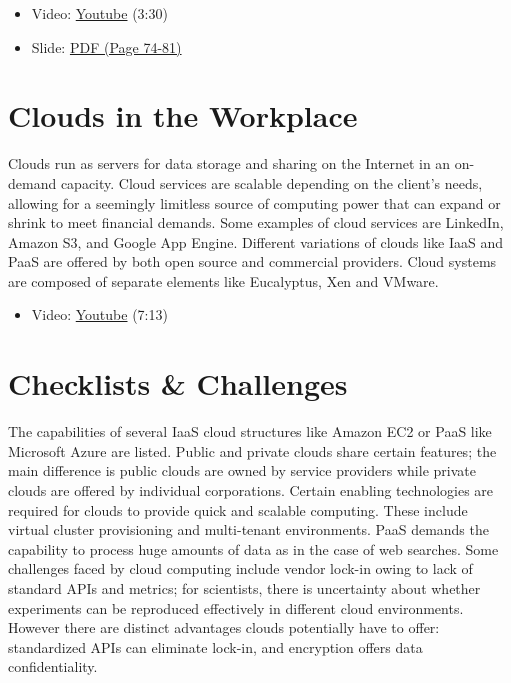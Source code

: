 \begin{itemize}

\item
  Video: \href{https://www.youtube.com/watch?v=mvXBRvTwAVg}{Youtube}
  (3:30)
\item
  Slide:
  \href{https://drive.google.com/open?id=0B88HKpainTSfQU1uQmxZWHdWQ1k}{PDF
  (Page 74-81)}
\end{itemize}

\section{Clouds in the Workplace}\label{clouds-in-the-workplace}

Clouds run as servers for data storage and sharing on the Internet in an
on-demand capacity. Cloud services are scalable depending on the
client's needs, allowing for a seemingly limitless source of computing
power that can expand or shrink to meet financial demands. Some examples
of cloud services are LinkedIn, Amazon S3, and Google App Engine.
Different variations of clouds like IaaS and PaaS are offered by both
open source and commercial providers. Cloud systems are composed of
separate elements like Eucalyptus, Xen and VMware.

\begin{itemize}

\item
  Video: \href{https://www.youtube.com/watch?v=Endt6mWUfEo}{Youtube}
  (7:13)
\end{itemize}

\section{Checklists \& Challenges}\label{checklists-challenges}

The capabilities of several IaaS cloud structures like Amazon EC2 or
PaaS like Microsoft Azure are listed. Public and private clouds share
certain features; the main difference is public clouds are owned by
service providers while private clouds are offered by individual
corporations. Certain enabling technologies are required for clouds to
provide quick and scalable computing. These include virtual cluster
provisioning and multi-tenant environments. PaaS demands the capability
to process huge amounts of data as in the case of web searches. Some
challenges faced by cloud computing include vendor lock-in owing to lack
of standard APIs and metrics; for scientists, there is uncertainty about
whether experiments can be reproduced effectively in different cloud
environments. However there are distinct advantages clouds potentially
have to offer: standardized APIs can eliminate lock-in, and encryption
offers data confidentiality.

